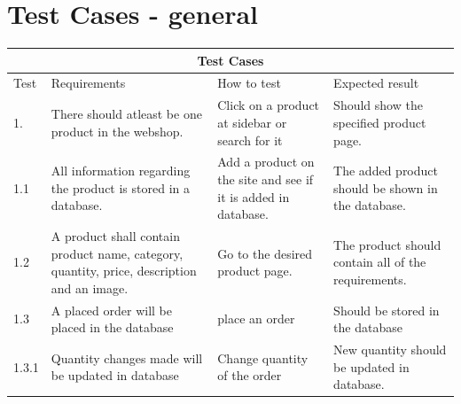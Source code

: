 \documentclass[a4paper,12pt]{article}
\begin{document}
\section{Test Cases - general}
\begin{tabular}{ |p{1cm}||p{4cm}|p{4cm}|p{4cm}|  }
	\hline
	\multicolumn{4}{|c|}{Test Cases} \\
	\hline
	Test& Requirements &How to test&Expected result\\
	\hline
	1.  & There should atleast be one product in the webshop.    & Click on a product at sidebar or search for it& Should show the specified product page.\\
	\hline
	1.1  & All information regarding the product is stored in a database.   & Add a product on the site and see if it is added in database.& The added product should be shown in the database.\\
	\hline
	1.2  & A product shall contain product name, category, quantity, price, description and an image.    &Go to the desired product page.& The product should contain all of the requirements.\\
	\hline
	1.3&  A placed order will be placed in the database  & place an order   &Should be stored in the database\\
	\hline
	1.3.1 & Quantity changes made will be updated in database&Change quantity of the order & New quantity should be updated in database.\\
	\hline

	
	
	
\end{tabular}
	\newpage
\end{document}
